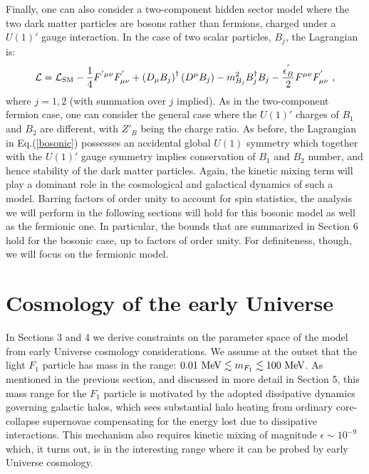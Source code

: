 \documentclass[12pt]{article}
\begin{document}
Finally, one can also consider a two-component hidden sector model where
the two dark matter particles are bosons rather than fermions, 
charged under a $U(1)'$ gauge interaction. In the case of two scalar
particles, $B _j$, the Lagrangian is:
%
\begin{eqnarray}
{\cal L} = {\cal L} _{\text{SM}} - \frac{1}{4}F ^{'\mu \nu}F ^{'} _{\mu
\nu} + \left ( D _{\mu}B _j \right ) ^{\dagger}\left ( D ^{\mu}B _j
\right ) - m _{B _j} ^2B _j ^{\dagger}B _j - \frac{\epsilon ^{'} _B}{2}F
^{\mu \nu} F _{\mu \nu} ^{'} \ ,
\label{bosonic}
\end{eqnarray}
%
where $j=1,2$ (with summation over $j$ implied). As in the two-component
fermion case, one can consider the general case where the $U(1)'$
charges of $B _1$
and $B _2$ are different, with $Z' _B$ being the charge ratio. As
before, the Lagrangian in Eq.(\ref{bosonic}) possesses an accidental
global $U(1)$ 
symmetry which together with the $U(1)'$ gauge symmetry 
implies conservation of $B _1$ and $B _2$ number, and hence stability of
the dark matter particles. Again, the kinetic mixing term will play a 
dominant role in the cosmological and galactical dynamics of such a
model. Barring factors of order unity to account for spin statistics,
the analysis we will perform in the following sections will hold for
this bosonic model as well as the fermionic one. In particular, the
bounds that are summarized in Section 6 hold for the bosonic case, up to
factors of order unity. For definiteness, though, we will focus on the
fermionic model.

\section{Cosmology of the early Universe}
\vskip 0.5cm

In Sections 3 and 4 we derive constraints on the parameter space of the
model from early Universe cosmology considerations. 
We assume at the outset that the light $F_1$ particle has mass in the
range:
$0.01 \ {\rm MeV} \lesssim m _{F_1} \lesssim 100 \ {\rm MeV}$.
As mentioned in the previous section, and discussed in more detail in
Section 5, this mass range for the $F_1$ particle is 
motivated by the adopted dissipative dynamics governing galactic halos,
which sees 
substantial halo heating from ordinary core-collapse supernovae  
compensating for the energy lost due to dissipative interactions.
This mechanism also requires kinetic mixing of magnitude $\epsilon \sim
10^{-9}$ which, it turns out, is in the interesting
range where it can be probed by early Universe cosmology.
\end{document}
